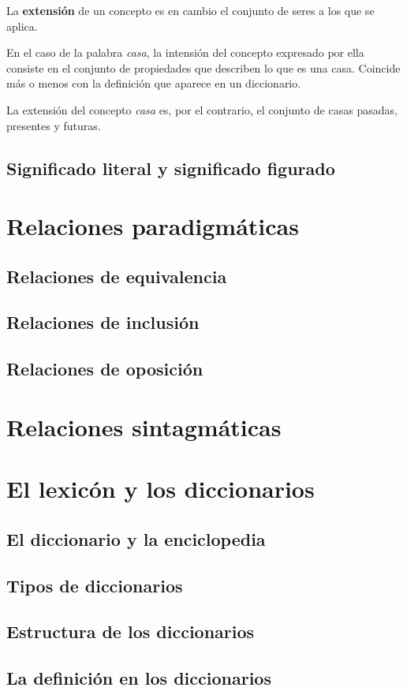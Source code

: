 \documentclass[12pt]{article}
\begin{document}
La \textbf{extensión} de un concepto es en cambio el conjunto de seres a los que se aplica.

En el caso de la palabra \textit{casa}, la intensión del concepto expresado por ella consiste en el conjunto de propiedades que describen lo que es una casa. Coincide más o menos con la definición que aparece en un diccionario.

La extensión del concepto \textit{casa} es, por el contrario, el conjunto de casas pasadas, presentes y futuras.

\subsection{Significado literal y significado figurado}
\section{Relaciones paradigmáticas}
\subsection{Relaciones de equivalencia}
\subsection{Relaciones de inclusión}
\subsection{Relaciones de oposición}
\section{Relaciones sintagmáticas}
\section{El lexicón y los diccionarios}
\subsection{El diccionario y la enciclopedia}
\subsection{Tipos de diccionarios}
\subsection{Estructura de los diccionarios}
\subsection{La definición en los diccionarios}
\end{document}
